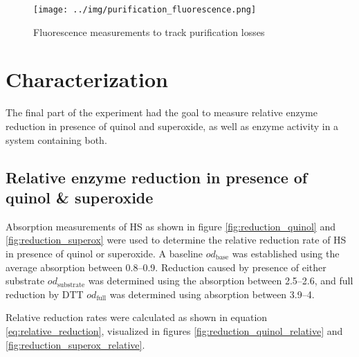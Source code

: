 \begin{figure}
	\centering
	\texttt{[image: ../img/purification\_fluorescence.png]}
	\caption{Fluorescence measurements to track purification losses}
	\label{fig:purification_fluorescence}
\end{figure}

\section{Characterization}

The final part of the experiment had the goal to measure relative enzyme
reduction in presence of quinol and superoxide, as well as enzyme activity in a
system containing both.

\subsection{Relative enzyme reduction in presence of quinol \& superoxide}

Absorption measurements of HS as shown in figure \ref{fig:reduction_quinol} and
\ref{fig:reduction_superox} were used to determine the relative reduction rate
of HS in presence of quinol or superoxide. A baseline $od_{\text{base}}$ was
established using the average absorption between \SIrange{0.8}{0.9}{\min}.
Reduction caused by presence of either substrate $od_{\text{substrate}}$ was
determined using the absorption between \SIrange{2.5}{2.6}{\min}, and full
reduction by DTT $od_{\text{full}}$ was determined using absorption between
\SIrange{3.9}{4}{\min}.

Relative reduction rates were calculated as shown in equation
\ref{eq:relative_reduction}, visualized in figures
\ref{fig:reduction_quinol_relative} and \ref{fig:reduction_superox_relative}. 

